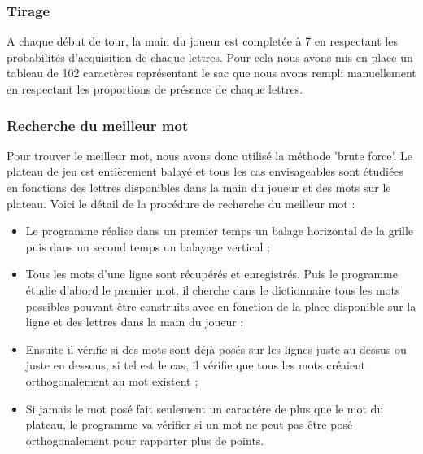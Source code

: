 \documentclass[a4paper,8pt,french,fleqn]{article}
\begin{document}
\subsubsection{Tirage}

A chaque début de tour, la main du joueur est completée à 7 en respectant les probabilités d'acquisition de chaque lettres. Pour cela nous avons mis en place un tableau de 102 caractères représentant le sac que nous avons rempli manuellement en respectant les proportions de présence de chaque lettres. 

\subsubsection{Recherche du meilleur mot}

Pour trouver le meilleur mot, nous avons donc utilisé la méthode 'brute force'. Le plateau de jeu est entièrement balayé et tous les cas envisageables sont étudiées en fonctions des lettres disponibles dans la main du joueur et des mots sur le plateau. Voici le détail de la procédure de recherche du meilleur mot : \\

\begin{itemize}

\item Le programme réalise dans un premier temps un balage horizontal de la grille puis dans un second temps un balayage vertical ; \\

\item Tous les mots d'une ligne sont récupérés et enregistrés. Puis le programme étudie d'abord le premier mot, il cherche dans le dictionnaire tous les mots possibles pouvant être construits avec en fonction de la place disponible sur la ligne et des lettres dans la main du joueur ; \\

\item  Ensuite il vérifie si des mots sont déjà posés sur les lignes juste au dessus ou juste en dessous, si tel est le cas, il vérifie que tous les mots créaient orthogonalement au mot existent ; \\

\item Si jamais le mot posé fait seulement un caractére de plus que le mot du plateau, le programme va vérifier si un mot ne peut pas être posé orthogonalement pour rapporter plus de points. \\

\end{itemize}
\end{document}
